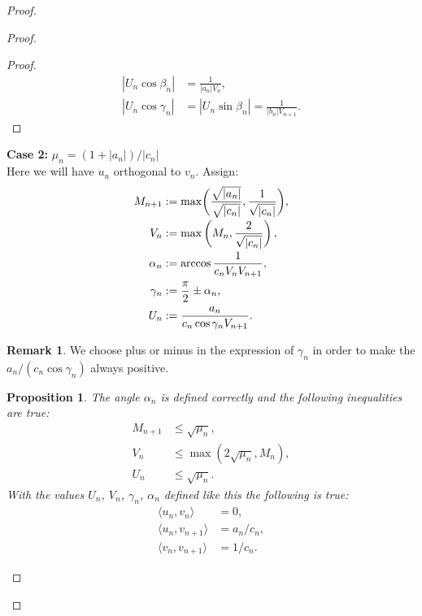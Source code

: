 \documentclass[12pt]{article}
\renewcommand{\leq}{\leqslant}
\newtheorem{prop}{Proposition}
\theoremstyle{definition}
\newtheorem*{remark*}{Remark}
\numberwithin{remark}{section}
\numberwithin{theorem}{section}
\numberwithin{prop}{section}
\numberwithin{equation}{section}
\numberwithin{lemma}{section}
\numberwithin{prop_under_lemma}{lemma}
\begin{document}
\begin{proof}
\begin{proof}
\begin{proof}
\begin{align*}
                        |U_n \cos{\beta_n}| &= \frac{1}{|a_n|V_n},\\
                        \left|U_n \cos{\gamma_n}\right| &= \left|U_n \sin{\beta_n}\right| = \frac{1}{|b_n|V_{n+1}}.
                    \end{align*}
                \end{proof}
            \noindent\textbf{Case 2:} $\mu_n = (1 + |a_n|)/|c_n|$\\
                Here we will have $u_n$ orthogonal to $v_n$.
                Assign:
                \begin{align*}
                    M_{n+1} &:= \max\biggl(\smash[b]{\frac{\sqrt{|a_n|}}{\sqrt{|c_n|}}}, \frac{1}{\sqrt{\smash[b]{|c_n|}}}\biggr),\\
                    V_n &:= \max\left(M_n, \frac{2}{\sqrt{\smash[b]{|c_n|}}}\right),\\
                    \alpha_n &:= \arccos{\frac{1}{c_n V_n V_{n+1}}},\\
                    \gamma_n &:= \frac{\pi}{2} \pm \alpha_n,\\
                    U_n &:= \frac{a_n}{c_n \cos{\gamma_n} V_{n+1}}.
                \end{align*}
                \begin{remark*}
                    We choose plus or minus in the expression of $\gamma_n$ in order to make the $a_n/(c_n \cos{\gamma_n})$ always positive.
                \end{remark*}
                \begin{prop}
                    The angle $\alpha_n$ is defined correctly and the following inequalities are true:
                    \begin{align*}
                        M_{n+1} &\leq \sqrt{\mu_n},\\
                        V_n &\leq \max(2\sqrt{\mu_n}, M_n),\\
                        U_n &\leq \sqrt{\mu_n}.
                    \end{align*}
                    With the values $U_n$, $V_n$, $\gamma_n$, $\alpha_n$ defined like this the following is true:
                    \begin{align*}
                        \langle u_n, v_n \rangle &= 0,\\
                        \langle u_n, v_{n+1} \rangle &= a_n/c_n,\\
                        \langle v_n, v_{n+1} \rangle &= 1/c_n.
                    \end{align*}

\end{prop}
\end{proof}
\end{proof}
\end{document}
